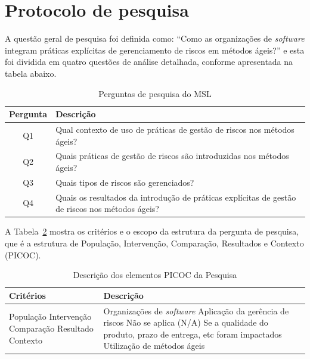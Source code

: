 \documentclass[
	12pt,
	openright,
	twoside,
	a4paper,
	english,
	brazil
	]{abntex2}
\begin{document}
\section{Protocolo de pesquisa}

A questão geral de pesquisa foi definida como: “Como as organizações de \textit{software} integram práticas explícitas de gerenciamento de riscos em métodos ágeis?” e esta foi dividida em quatro questões de análise detalhada, conforme apresentada na tabela abaixo.

\begin{table}[h!]
  \caption{Perguntas de pesquisa do MSL}
  \centering
  \begin{tabular}{|c|p{10cm}|}
  \hline
  \textbf{Pergunta} & \textbf{Descrição} \\ \hline
  Q1 & Qual contexto de uso de práticas de gestão de riscos nos métodos ágeis? \\ \hline
  Q2 & Quais práticas de gestão de riscos são introduzidas nos métodos ágeis? \\ \hline
  Q3 & Quais tipos de riscos são gerenciados? \\ \hline
  Q4 & Quais os resultados da introdução de práticas explícitas de gestão de riscos nos métodos ágeis? \\ \hline
  \end{tabular}
  \label{tab:perguntas-msl}
\end{table}

A Tabela~\ref{tab:picoc} \cite{kitchenham2007guidelines} mostra os critérios e o escopo da estrutura da pergunta de pesquisa, que é a estrutura de População, Intervenção, Comparação, Resultados e Contexto (PICOC).

\begin{table}[H]
  \centering
  \caption{Descrição dos elementos PICOC da Pesquisa}
  \begin{tabular}{|p{3cm}|p{12cm}|}
  \hline
  \textbf{Critérios} & \textbf{Descrição} \\ \hline
  População \newline Intervenção \newline Comparação \newline Resultado \newline Contexto 
  & Organizações de \textit{software} \newline Aplicação da gerência de riscos \newline Não se aplica (N/A) \newline Se a qualidade do produto, prazo de entrega, etc foram impactados \newline Utilização de métodos ágeis \\ \hline
  \end{tabular}
  \label{tab:picoc}
\end{table}
\end{document}

